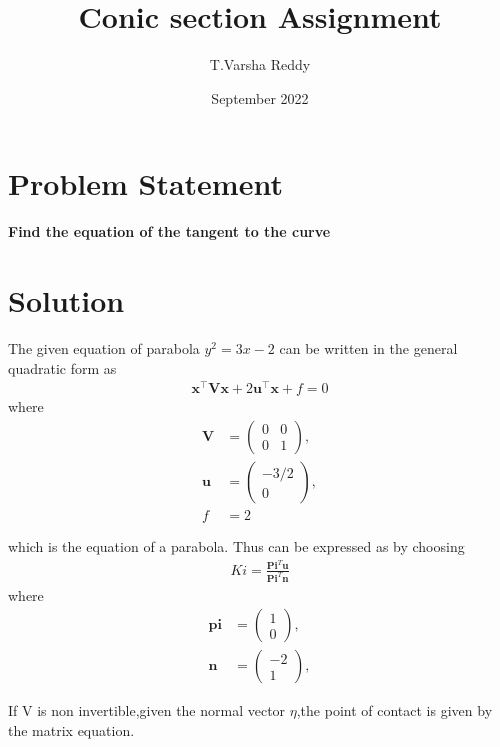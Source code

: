 \documentclass[journal,10pt,twocolumn]{article}
\title{\textbf{Conic section Assignment}}
\author{T.Varsha Reddy}
\date{September 2022}
\let\vec\mathbf
\newcommand{\myvec}[1]{\ensuremath{\begin{pmatrix}#1\end{pmatrix}}}
\begin{document}
\maketitle
\section{Problem Statement}
\textbf{Find the equation of the tangent to the curve} 

\section{Solution}
The given equation of parabola $y^2 = 3x-2$ can be written in the general quadratic form as
\begin{align}
    \label{eq:conic_quad_form}
    \vec{x}^{\top}\vec{V}\vec{x}+2\vec{u}^{\top}\vec{x}+f=0
    \end{align}
where
\begin{align}
	\label{eq:V_matrix}
	\vec{V} &= \myvec{0 & 0\\0 & 1},
	\\
	\label{eq:u_vector}
	\vec{u} &= \myvec{-3/2\\0},
	\\
	\label{eq:f_value}
	f &= 2
\end{align}


which is the equation of a parabola. 
Thus can be expressed as by choosing
\begin{align}
Ki = \frac{\vec{Pi}^T\vec{u}}{\vec{Pi}^T\vec{n}}
\end{align}
   where
   \begin{align}
     \vec{pi} &= \myvec{1\\0},
     \\
     \vec{n} &= \myvec{-2\\1},
    \end{align}
   
If V is non invertible,given the normal vector $\eta$,the point of contact is given by the matrix equation. 
\end{document}
